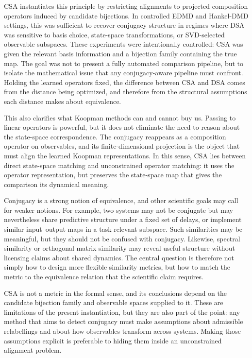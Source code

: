 \documentclass{article}
\theoremstyle{definition}
\begin{document}
CSA instantiates this principle by restricting alignments to projected composition operators induced by candidate bijections. In controlled EDMD and Hankel-DMD settings, this was sufficient to recover conjugacy structure in regimes where DSA was sensitive to basis choice, state-space transformations, or SVD-selected observable subspaces. These experiments were intentionally controlled: CSA was given the relevant basis information and a bijection family containing the true map. The goal was not to present a fully automated comparison pipeline, but to isolate the mathematical issue that any conjugacy-aware pipeline must confront. Holding the learned operators fixed, the difference between CSA and DSA comes from the distance being optimized, and therefore from the structural assumptions each distance makes about equivalence.

This also clarifies what Koopman methods can and cannot buy us. Passing to linear operators is powerful, but it does not eliminate the need to reason about the state-space correspondence. The conjugacy reappears as a composition operator on observables, and its finite-dimensional projection is the object that must align the learned Koopman representations. In this sense, CSA lies between direct state-space matching and unconstrained operator matching: it uses the operator representation, but preserves the state-space map that gives the comparison its dynamical meaning.

Conjugacy is a strong notion of equivalence, and other scientific goals may call for weaker notions. For example, two systems may not be conjugate but may nevertheless share predictive structure under a fixed set of delays, or implement similar input--output maps in a task-relevant subspace. Such similarities may be meaningful, but they should not be confused with conjugacy. Likewise, spectral similarity or orthogonal matrix similarity may reveal useful structure without licensing claims about shared dynamics. The central question is therefore not simply how to design more flexible similarity metrics, but how to match the metric to the equivalence relation that the scientific claim requires.

CSA is not a metric in the formal sense, and its conclusions depend on the candidate bijection family and observable spaces supplied to it. These are limitations of the present instantiation, but they are also part of the point: any method that aims to detect conjugacy must make assumptions about admissible relabellings and about how observables transform across systems. Making those assumptions explicit is preferable to hiding them inside an unconstrained alignment problem.
\end{document}
